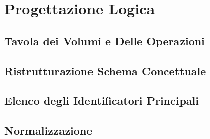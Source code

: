 \documentclass[12pt]{article} %
\begin{document}
		


	\section{Progettazione Logica}

		\subsection{Tavola dei Volumi e Delle Operazioni}

		
		\subsection{Ristrutturazione Schema Concettuale}

		
    \newpage
		\subsection{Elenco degli Identificatori Principali}

		
    \newpage
		\subsection{Normalizzazione}

		
%
% 		
%
%
%
% 		
%
%
%
% 		
%
%
\end{document}

